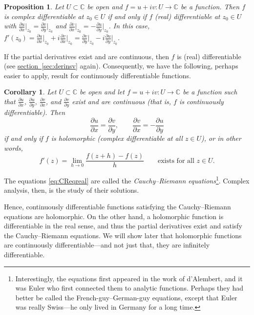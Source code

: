 \documentclass[12pt,openany]{book}
\newcommand{\C}{{\mathbb{C}}}
\newcommand{\myindex}[1]{#1\index{#1}}
\theoremstyle{plain}
\newtheorem{prop}[thm]{Proposition}
\newtheorem{cor}[thm]{Corollary}
\theoremstyle{remark}
\theoremstyle{definition}
\theoremstyle{exercise}
\theoremstyle{example}
\newcommand{\sectionref}[1]{\hyperref[#1]{section~\ref*{#1}}}
\begin{document}
\begin{prop}
Let $U \subset \C$ be open and $f = u+iv \colon U \to \C$ be a function.
Then
$f$ is complex differentiable at $z_0 \in U$
if and only if
$f$ (real) differentiable at $z_0 \in U$
with
$\frac{\partial u}{\partial x}\big|_{z_0} =
\frac{\partial v}{\partial y}\big|_{z_0}$
and
$\frac{\partial v}{\partial x}\big|_{z_0} =
-\frac{\partial u}{\partial y}\big|_{z_0}$.
In this case,
$f'(z_0) = 
\frac{\partial u}{\partial x}\big|_{z_0} + i \frac{\partial v}{\partial
x}\big|_{z_0} = \frac{\partial v}{\partial y}\big|_{z_0} - i \frac{\partial
u}{\partial y}\big|_{z_0}$.
\end{prop}

If the partial derivatives exist and are continuous, then $f$ is
(real) differentiable (see \sectionref{sec:derinsv} again).
Consequently, we have the following, perhaps easier to apply, result
for continuously differentiable functions.

\begin{cor}
Let $U \subset \C$ be open and let $f = u+iv \colon U \to \C$ be a function
such that $\frac{\partial u}{\partial x}$, $\frac{\partial u}{\partial y}$, $\frac{\partial
v}{\partial x}$, and $\frac{\partial v}{\partial y}$ exist and are continuous (that is,
$f$ is continuously differentiable).
Then
\begin{equation} \label{eq:CReqreal}
\frac{\partial u}{\partial x} = \frac{\partial v}{\partial y} , \qquad
\frac{\partial v}{\partial x} = -\frac{\partial u}{\partial y}
\end{equation}
if and only if $f$ is holomorphic (complex differentiable at all $z \in U$),
or in other words,
\begin{equation*}
f'(z) =
\lim_{h \to 0} \frac{f(z+h) - f(z)}{h}
\qquad
\text{exists for all $z \in U$.}
\end{equation*}
\end{cor}

The equations \eqref{eq:CReqreal} are called the
\emph{\myindex{Cauchy--Riemann equations}}\footnote{Interestingly,
the equations first appeared in the work of d'Alembert, and
it was Euler who first connected them to analytic functions.
Perhaps they had better be called the French-guy--German-guy equations,
except that Euler was really Swiss---he only lived in Germany for a long time.}.
Complex analysis, then, is the study of their solutions.

Hence, continuously differentiable functions satisfying
the Cauchy--Riemann equations are holomorphic.
On the other hand,
a holomorphic function is differentiable in the real sense,
and thus the partial derivatives exist and satisfy the Cauchy--Riemann
equations.  We will show later that holomorphic functions are
continuously differentiable---and not just that, they are
infinitely differentiable.
\end{document}
